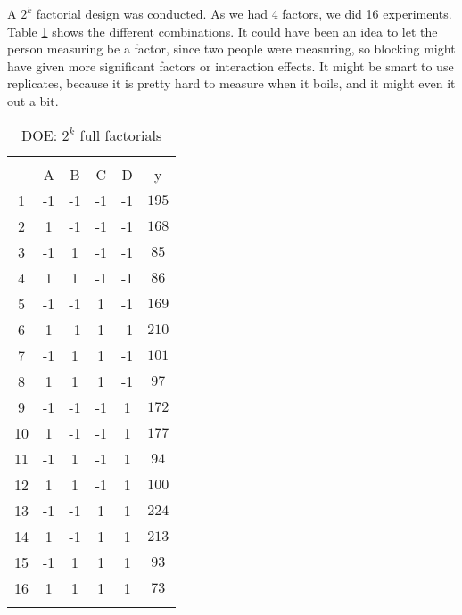 A $2^k$ factorial design was conducted. As we had 4 factors, we did 16 experiments. Table \ref{DOEtable} shows the different combinations. It could have been an idea to let the person measuring be a factor, since two people were measuring, so blocking might have given more significant factors or interaction effects. It might be smart to use replicates, because it is pretty hard to measure when it boils, and it might even it out a bit.

\begin{table}[H] \centering 
  \caption{DOE: $2^k$ full factorials} 
  \label{DOEtable} 
\begin{tabular}{@{\extracolsep{5pt}} cccccc} 
\\[-1.8ex]\hline 
\hline \\[-1.8ex] 
 & A & B & C & D & y \\ 
1 & -1 & -1 & -1 & -1 & $195$ \\ 
2 & 1 & -1 & -1 & -1 & $168$ \\ 
3 & -1 & 1 & -1 & -1 & $85$ \\ 
4 & 1 & 1 & -1 & -1 & $86$ \\ 
5 & -1 & -1 & 1 & -1 & $169$ \\ 
6 & 1 & -1 & 1 & -1 & $210$ \\ 
7 & -1 & 1 & 1 & -1 & $101$ \\ 
8 & 1 & 1 & 1 & -1 & $97$ \\ 
9 & -1 & -1 & -1 & 1 & $172$ \\ 
10 & 1 & -1 & -1 & 1 & $177$ \\ 
11 & -1 & 1 & -1 & 1 & $94$ \\ 
12 & 1 & 1 & -1 & 1 & $100$ \\ 
13 & -1 & -1 & 1 & 1 & $224$ \\ 
14 & 1 & -1 & 1 & 1 & $213$ \\ 
15 & -1 & 1 & 1 & 1 & $93$ \\
16 & 1 & 1 & 1 & 1 & $73$ \\
\hline \\[-1.8ex] 
\end{tabular} 
\end{table} 